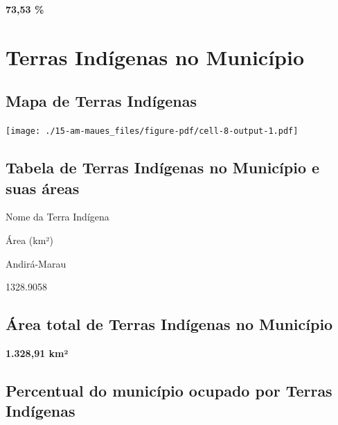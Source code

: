 \documentclass[
  letterpaper,
]{report}
\begin{document}
\textbf{73,53 \%}

\hypertarget{terras-induxedgenas-no-municuxedpio}{%
\section{Terras Indígenas no
Município}\label{terras-induxedgenas-no-municuxedpio}}

\hypertarget{mapa-de-terras-induxedgenas}{%
\subsection{Mapa de Terras
Indígenas}\label{mapa-de-terras-induxedgenas}}

\texttt{[image: ./15-am-maues\_files/figure-pdf/cell-8-output-1.pdf]}

\hypertarget{tabela-de-terras-induxedgenas-no-municuxedpio-e-suas-uxe1reas}{%
\subsection{Tabela de Terras Indígenas no Município e suas
áreas}\label{tabela-de-terras-induxedgenas-no-municuxedpio-e-suas-uxe1reas}}

\n  

\n    

\n      

Nome da Terra Indígena

\n      

Área (km²)

\n    

\n  

\n  

\n    

\n      

Andirá-Marau

\n      

1328.9058

\n    

\n  

\n

\hypertarget{uxe1rea-total-de-terras-induxedgenas-no-municuxedpio}{%
\subsection{Área total de Terras Indígenas no
Município}\label{uxe1rea-total-de-terras-induxedgenas-no-municuxedpio}}

\textbf{1.328,91 km²}

\hypertarget{percentual-do-municuxedpio-ocupado-por-terras-induxedgenas}{%
\subsection{Percentual do município ocupado por Terras
Indígenas}\label{percentual-do-municuxedpio-ocupado-por-terras-induxedgenas}}
\end{document}
